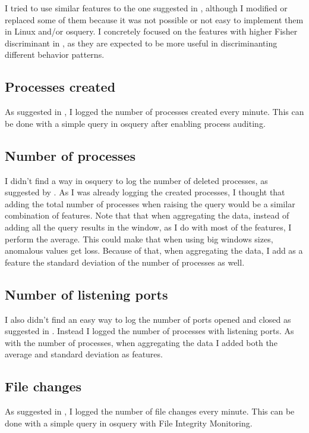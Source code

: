 \documentclass[oneside, 12pt]{article}
\begin{document}
I tried to use similar features to the one suggested in \cite{ruu_journal}, although I modified or replaced some of them because it was not possible or not easy to implement them in Linux and/or osquery.
I concretely focused on the features with higher Fisher discriminant in \cite{ruu_journal}, as they are expected to be more useful in discriminanting different behavior patterns.

\subsection{Processes created}

As suggested in \cite{ruu_journal}, I logged the number of processes created every minute.
This can be done with a simple query in osquery after enabling process auditing.

\subsection{Number of processes}

I didn't find a way in osquery to log the number of deleted processes, as suggested by \cite{ruu_journal}.
As I was already logging the created processes, I thought that adding the total number of processes when raising the query would be a similar combination of features.
Note that that when aggregating the data, instead of adding all the query results in the window, as I do with most of the features, I perform the average.
This could make that when using big windows sizes, anomalous values get loss.
Because of that, when aggregating the data, I add as a feature the standard deviation of the number of processes as well.

\subsection{Number of listening ports}

I also didn't find an easy way to log the number of ports opened and closed as suggested in \cite{ruu_journal}.
Instead I logged the number of processes with listening ports.
As with the number of processes, when aggregating the data I added both the average and standard deviation as features.

\subsection{File changes}

As suggested in \cite{ruu_journal}, I logged the number of file changes every minute.
This can be done with a simple query in osquery with File Integrity Monitoring.
\end{document}
